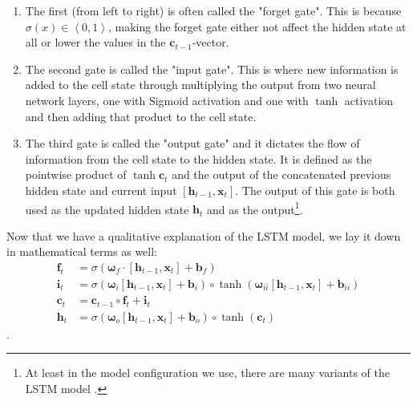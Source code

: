\begin{enumerate}
    \item The first (from left to right) is often called the "forget gate". This is because $\sigma(x) \in \left<0,1\right>$, making the forget gate either not affect the hidden state at all or lower the values in the $\bm{c}_{t-1}$-vector.
    \item The second gate is called the "input gate". This is where new information is added to the cell state through multiplying the output from two neural network layers, one with Sigmoid activation and one with $\tanh$ activation and then adding that product to the cell state.
    \item The third gate is called the "output gate" and it dictates the flow of information from the cell state to the hidden state. It is defined as the pointwise product of $\tanh{\bm{c}_t}$ and the output of the concatenated previous hidden state and current input $\left[\bm{h}_{t-1},\bm{x}_t\right]$. The output of this gate is both used as the updated hidden state $\bm{h}_t$ and as the output\footnote{At least in the model configuration we use, there are many variants of the LSTM model \citep{graves2012long}.}.
\end{enumerate}
Now that we have a qualitative explanation of the LSTM model, we lay it down in 
mathematical terms as well:
\begin{align}
    \bm{f}_t &= \sigma\left(\bm{\omega}_f\cdot \left[\bm{h}_{t-1},\bm{x}_t\right]+\bm{b}_f\right) \label{forget gate}\\
    \bm{i}_t &= \sigma\left(\bm{\omega}_i \left[ \bm{h}_{t-1}, \bm{x}_t\right] + \bm{b}_i\right) \circ \tanh\left(\bm{\omega}_{ii}\left[ \bm{h}_{t-1},\bm{x}_t  \right] + \bm{b}_{ii}\right) \label{input gate}\\
    \bm{c}_t &= \bm{c}_{t-1} \circ \bm{f}_t + \bm{i}_t \\
    \bm{h}_t &= \sigma \left( \bm{\omega}_o \left[ \bm{h}_{t-1}, \bm{x}_t \right] 
    + \bm{b}_o \right) \circ \tanh(\bm{c}_t) \label{output gate}
    \end{align}
\citep{hochreiter1997long} \citep{gers1999learning}.

